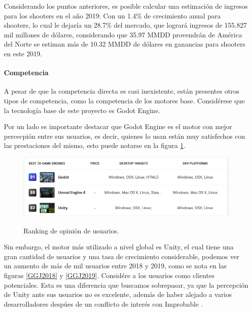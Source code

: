 \documentclass[]{article}
\begin{document}
Considerando los puntos anteriores, es posible calcular una estimaci\'on de ingresos para los shooters en el a\~no 2019:
Con un 1.4\% de crecimiento anual para shooters, lo cual le dejar\'ia un 28.7\% del mercado, que lograr\'a ingresos de 155.827 mil millones de d\'olares, considerando que 35.97 MMDD provendr\'an de Am\'erica del Norte se estiman m\'as de 10.32 MMDD de d\'olares en ganancias para shooters en este 2019. 
\paragraph{Competencia}
A pesar de que la competencia directa es casi inexistente, est\'an presentes otros tipos de competencia, como la competencia de los motores base. Consid\'erese que la tecnolog\'ia base de este proyecto es Godot Engine.

Por un lado es importante destacar que Godot Engine es el motor con mejor percecpi\'on entre sus usuarios, es decir, quienes lo usan est\'an muy satisfechos con las prestaciones del mismo, esto puede notarse en la figura \ref{SLANT}.
 
\begin{figure}[H]
	
	\centering
	\includegraphics[width=1\textwidth]{Ranking}
	\caption{Ranking de opini\'on de usuarios.  } \cite{Slant} 
	\label{SLANT}
	
\end{figure}

Sin embargo, el motor m\'as utilizado a nivel global es Unity, el cual tiene una gran cantidad de usuarios y una tasa de crecimiento considerable, podemos ver un aumento de m\'as de mil usuarios entre 2018 y 2019, como se nota en las figuras \ref{GGJ2018} y  \ref{GGJ2019}. Consid\'ere a los usuarios como clientes potenciales. Esta es una diferencia que buscamos sobrepasar, ya que la percepci\'on de Unity ante sus usuarios no es excelente, adem\'as de haber alejado a varios desarrolladores desp\'ues de un conflicto de inter\'es con Improbable \cite{Improbable}. 
\end{document}
